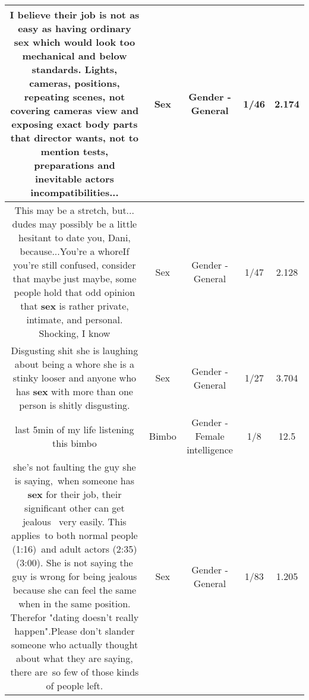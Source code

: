 \documentclass[11pt]{article}
\newlength\mylength
\begin{document}
\begin{center}
\begin{longtable}{|C{.65\mylength}|C{.30\mylength}|C{.12\mylength}|C{.12\mylength}|C{.12\mylength}|}
  \small I believe their job is not as easy as having ordinary \textbf{sex} which would look too mechanical and below standards. Lights, cameras, positions, repeating scenes, not covering cameras view and exposing exact body parts that director wants, not to mention tests, preparations and inevitable actors incompatibilities...\normalsize   & Sex & Gender - General & 1/46 & 2.174 \\  \hline
  \small This may be a stretch, but... dudes may possibly be a little hesitant to date you, Dani, because...You're a whoreIf you're still confused, consider that maybe just maybe, some people hold that odd opinion that \textbf{sex} is rather private, intimate, and personal. Shocking, I know\normalsize   & Sex & Gender - General & 1/47 & 2.128 \\  \hline
  \small Disgusting shit she is laughing about being a whore she is a stinky looser and anyone who has \textbf{sex} with more than one person is shitly disgusting.\normalsize   & Sex & Gender - General & 1/27 & 3.704 \\  \hline
  \small last 5min of my life listening this bimbo\normalsize   & Bimbo & Gender - Female intelligence & 1/8 & 12.5 \\  \hline
  \small she's not faulting the guy she is saying, when someone has \textbf{sex} for their job, their significant other can get jealous  very easily. This applies to both normal people (1:16) and adult actors (2:35)(3:00). She is not saying the guy is wrong for being jealous because she can feel the same when in the same position. Therefor "dating doesn't really happen".Please don't slander someone who actually thought about what they are saying, there are so few of those kinds of people left.\normalsize   & Sex & Gender - General & 1/83 & 1.205 \\  \hline

\end{longtable}
\end{center}
\end{document}
